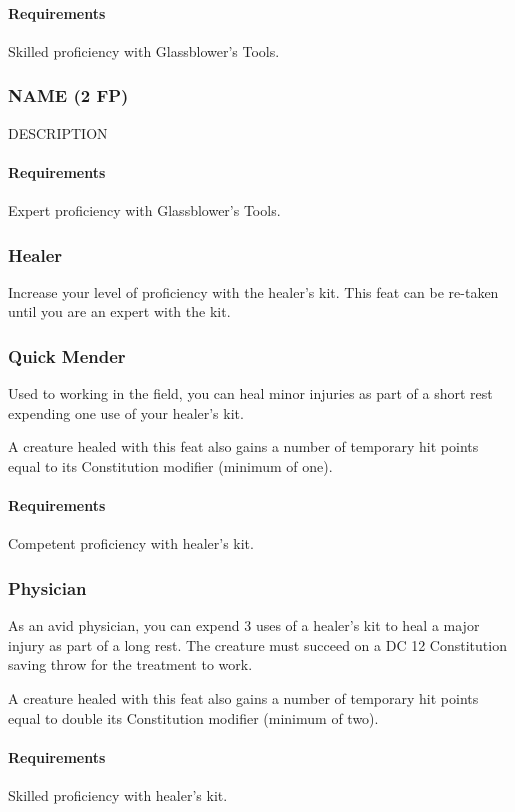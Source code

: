     \paragraph{Requirements} Skilled proficiency with Glassblower's Tools.
\subsubsection{NAME (2 FP)} \label{feat::name}
    DESCRIPTION
    \paragraph{Requirements} Expert proficiency with Glassblower's Tools.
\subsubsection{Healer} \label{feat::healer}
    Increase your level of proficiency with the healer's kit.
    This feat can be re-taken until you are an expert with the kit.
\subsubsection{Quick Mender} \label{feat::quickmender}
    Used to working in the field, you can heal minor injuries as part of a short rest expending one use of your healer's kit.

    A creature healed with this feat also gains a number of temporary hit points equal to its Constitution modifier (minimum of one).
    \paragraph{Requirements} Competent proficiency with healer's kit.
\subsubsection{Physician} \label{feat::physician}
    As an avid physician, you can expend 3 uses of a healer's kit to heal a major injury as part of a long rest.
    The creature must succeed on a DC 12 Constitution saving throw for the treatment to work.

    A creature healed with this feat also gains a number of temporary hit points equal to double its Constitution modifier (minimum of two).
    \paragraph{Requirements} Skilled proficiency with healer's kit.
